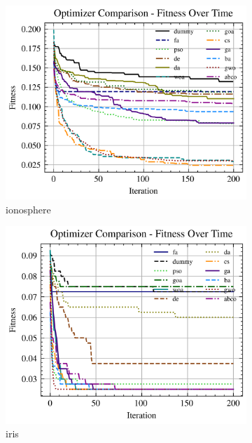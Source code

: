\begin{figure}[htp]
    \begin{subfigure}[htp]{0.45\textwidth}
        \includegraphics[width=\textwidth]{imagenes/fitness_charts/img/real/ionosphere/optimizers_fitness_knn.png}
        \caption{ionosphere}
    \end{subfigure}
    \begin{subfigure}[htp]{0.45\textwidth}
        \includegraphics[width=\textwidth]{imagenes/fitness_charts/img/real/iris/optimizers_fitness_knn.png}
        \caption{iris}
    \end{subfigure}
    \begin{subfigure}[htp]{0.45\textwidth}

\end{subfigure}
\end{figure}
